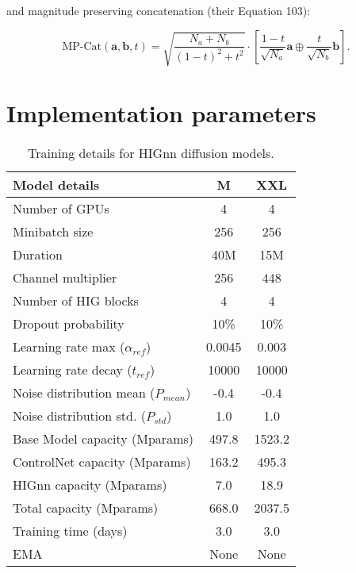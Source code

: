 and magnitude preserving concatenation (their Equation 103):

\begin{equation}
\text{MP-Cat}(\mathbf{a}, \mathbf{b}, t) = \sqrt{\frac{N_a + N_b}{(1 - t)^2 + t^2}} \cdot \left[ \frac{1 - t}{\sqrt{N_a}} \mathbf{a} \oplus \frac{t}{\sqrt{N_b}} \mathbf{b} \right].
 \label{eq:mp_cat}
\end{equation}

\section{Implementation parameters}
\label{appendix:parameter_table}


\begin{table}[h]
\centering
\caption{Training details for HIGnn diffusion models.}
\begin{tabular}{@{}lcc@{}}
\toprule
\textbf{Model details}                      &\textbf{ M} & \textbf{XXL} \\ \midrule
Number of GPUs                     &  4 &  4   \\
Minibatch size                     &  256 & 256    \\
Duration                           & 40M &  15M   \\
Channel multiplier                 & 256 & 448    \\
Number of HIG blocks  &  4 &  4    \\
Dropout probability                & 10\% &  10\%   \\
Learning rate max ($\alpha_{ref}$)   & 0.0045 & 0.003    \\
Learning rate decay ($t_{ref}$)      & 10000 & 10000   \\
Noise distribution mean ($P_{mean}$) &  -0.4 &  -0.4   \\
Noise distribution std. ($P_{std}$)  &  1.0 &  1.0    \\ 
Base Model capacity (Mparams)  &  497.8 &  1523.2    \\
ControlNet capacity (Mparams)  &  163.2 &  495.3   \\
HIGnn capacity (Mparams)  &  7.0 &  18.9    \\
Total capacity (Mparams)  &  668.0 &  2037.5    \\
Training time (days) &  3.0 &  3.0    \\
EMA &  None &  None    \\
\bottomrule
\end{tabular}
\label{table:model_hparams}
\end{table}


